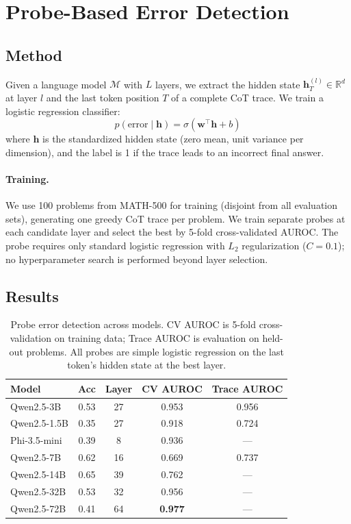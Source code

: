 \documentclass[11pt]{article}
\newcommand{\modelsmall}{Qwen2.5-3B}
\newcommand{\modelmed}{Qwen2.5-7B}
\newcommand{\modellarge}{Qwen2.5-14B}
\newcommand{\modelphi}{Phi-3.5-mini}
\begin{document}
\section{Probe-Based Error Detection}
\label{sec:detection}

\subsection{Method}

Given a language model $\mathcal{M}$ with $L$ layers, we extract the hidden state $\mathbf{h}^{(l)}_T \in \mathbb{R}^d$ at layer $l$ and the last token position $T$ of a complete CoT trace.
We train a logistic regression classifier:
\begin{equation}
p(\text{error} \mid \mathbf{h}) = \sigma(\mathbf{w}^\top \mathbf{h} + b)
\end{equation}
where $\mathbf{h}$ is the standardized hidden state (zero mean, unit variance per dimension), and the label is 1 if the trace leads to an incorrect final answer.

\paragraph{Training.}
We use 100 problems from MATH-500 \cite{hendrycks2021math} for training (disjoint from all evaluation sets), generating one greedy CoT trace per problem.
We train separate probes at each candidate layer and select the best by 5-fold cross-validated AUROC.
The probe requires only standard logistic regression with $L_2$ regularization ($C=0.1$); no hyperparameter search is performed beyond layer selection.

\subsection{Results}

\begin{table}[t]
\centering
\small
\begin{tabular}{lcccc}
\toprule
\textbf{Model} & \textbf{Acc} & \textbf{Layer} & \textbf{CV AUROC} & \textbf{Trace AUROC} \\
\midrule
\modelsmall & 0.53 & 27 & 0.953 & 0.956 \\
Qwen2.5-1.5B & 0.35 & 27 & 0.918 & 0.724 \\
\modelphi & 0.39 & 8 & 0.936 & --- \\
\modelmed & 0.62 & 16 & 0.669 & 0.737 \\
\modellarge & 0.65 & 39 & 0.762 & --- \\
\midrule
Qwen2.5-32B & 0.53 & 32 & 0.956 & --- \\
Qwen2.5-72B & 0.41 & 64 & \textbf{0.977} & --- \\
\bottomrule
\end{tabular}
\caption{Probe error detection across models. CV AUROC is 5-fold cross-validation on training data; Trace AUROC is evaluation on held-out problems. All probes are simple logistic regression on the last token's hidden state at the best layer.}
\label{tab:probe_detection}
\end{table}
\end{document}
